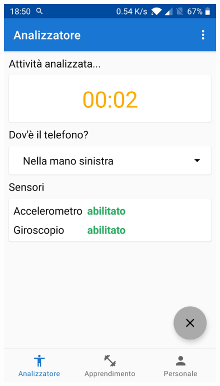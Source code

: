 \begin{figure}[H]
    \includegraphics[scale = 0.10]{assets/images/screenshots/1b_Preparation.jpg}

\end{figure}

